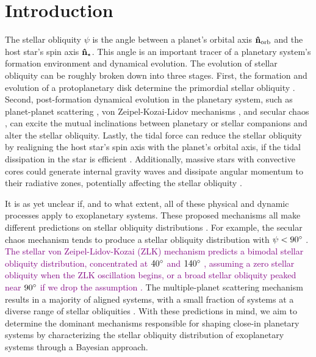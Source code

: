 \documentclass[twocolumn,times]{aastex631}
\newcommand{\edits}[1]{\textcolor{purple}{#1}}
\begin{document}
\section{Introduction}
\label{sec:intro}

The stellar obliquity $\psi$ is the angle between a planet's orbital axis $\vb{\hat{n}_{\rm orb}}$ and the host star's spin axis $\vb{\hat{n}_\star}$. 
This angle is an important tracer of a planetary system's formation environment and dynamical evolution. The evolution of stellar obliquity can be roughly broken down into three stages. First, the formation and evolution of a protoplanetary disk determine the primordial stellar obliquity \citep[e.g.,][]{Bate10, Lai11, Batygin12}. Second, post-formation dynamical evolution in the planetary system, such as planet-planet scattering \citep[e.g.,][]{Rasio96, Chatterjee08, Nagasawa08, Beague12}, von Zeipel-Kozai-Lidov mechanisms \citep[e.g.,][]{Wu03, Naoz16}, and secular chaos \citep{Wu11}, can excite the mutual inclinations between planetary or stellar companions and alter the stellar obliquity. Lastly, the tidal force can reduce the stellar obliquity by realigning the host star's spin axis with the planet's orbital axis, if the tidal dissipation in the star is efficient \citep[e.g.,][]{Winn10, Albrecht12}. Additionally, massive stars with convective cores could generate internal gravity waves and dissipate angular momentum to their radiative zones, potentially affecting the stellar obliquity \citep{Rogers12, Rogers13}.

It is as yet unclear if, and to what extent, all of these physical and dynamic processes apply to exoplanetary systems. These proposed mechanisms all make different predictions on stellar obliquity distributions \citep[see][and references therein]{Albrecht22, Dawson18}. For example, the secular chaos mechanism tends to produce a stellar obliquity distribution with $\psi < 90\mbox{$^\circ$}$ \citep[e.g.,][]{Teyssandier19}. \edits{The stellar von Zeipel-Lidov-Kozai (ZLK) mechanism predicts a bimodal stellar obliquity distribution, concentrated at $40\mbox{$^\circ$}$ and $140\mbox{$^\circ$}$ \citep[e.g.,][]{Fabrycky07, Anderson16, Vick19}, assuming a zero stellar obliquity when the ZLK oscillation begins, or a broad stellar obliquity peaked near $90\mbox{$^\circ$}$ if we drop the assumption \citep{Vick23}.} The multiple-planet scattering mechanism results in a majority of aligned systems, with a small fraction of systems at a diverse range of stellar obliquities \citep[e.g.,][]{Beague12}. 
With these predictions in mind, we aim to determine the dominant mechanisms responsible for shaping close-in planetary systems by characterizing the stellar obliquity distribution of exoplanetary systems through a Bayesian approach.
\end{document}

